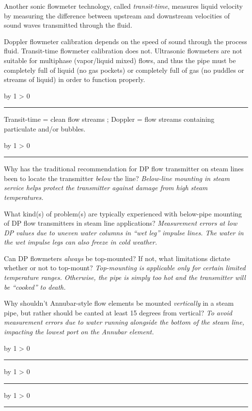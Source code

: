 \documentclass[12pt,a4paper]{article}
\def\svar{
           \advance\answnum by 1
           \ifnum \answnum > 0
                \hrule
                \vskip 3pt
                \leftline{Svar \the\answnum}
                \vskip 3pt \fi}
\begin{document}
Another sonic flowmeter technology, called {\it transit-time}, measures liquid velocity by measuring the difference between upstream and downstream velocities of sound waves transmitted through the fluid.

Doppler flowmeter calibration depends on the speed of sound through the process fluid.  Transit-time flowmeter calibration does not.  Ultrasonic flowmeters are not suitable for multiphase (vapor/liquid mixed) flows, and thus the pipe must be completely full of liquid (no gas pockets) or completely full of gas (no puddles or streams of liquid) in order to function properly.  

\vskip 10pt \filbreak 
\svar{} 

Transit-time = clean flow streams ; Doppler = flow streams containing particulate and/or bubbles.

\vskip 10pt \filbreak 
\svar{} 

Why has the traditional recommendation for DP flow transmitter on steam lines been to locate the transmitter {\it below} the line?  {\it Below-line mounting in steam service helps protect the transmitter against damage from high steam temperatures.}

\vskip 10pt

What kind(s) of problem(s) are typically experienced with below-pipe mounting of DP flow transmitters in steam line applications? {\it Measurement errors at low DP values due to uneven water columns in ``wet leg'' impulse lines.  The water in the wet impulse legs can also freeze in cold weather.}

\vskip 10pt

Can DP flowmeters {\it always} be top-mounted?  If not, what limitations dictate whether or not to top-mount?  {\it Top-mounting is applicable only for certain limited temperature ranges.  Otherwise, the pipe is simply too hot and the transmitter will be ``cooked'' to death.}

\vskip 10pt

Why shouldn't Annubar-style flow elements be mounted {\it vertically} in a steam pipe, but rather should be canted at least 15 degrees from vertical?  {\it To avoid measurement errors due to water running alongside the bottom of the steam line, impacting the lowest port on the Annubar element.}

\vskip 10pt \filbreak 
\svar{} 


\vskip 10pt \filbreak 
\svar{} 


\vskip 10pt \filbreak 
\svar{} 
\end{document}
